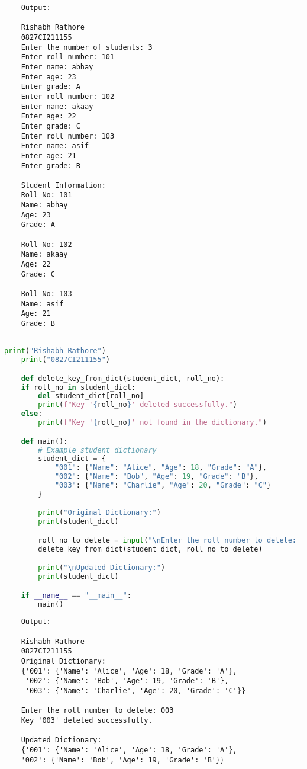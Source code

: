\documentclass{report}
\begin{document}
\begin{verbatim}
	Output:

	Rishabh Rathore
	0827CI211155
	Enter the number of students: 3
	Enter roll number: 101
	Enter name: abhay
	Enter age: 23
	Enter grade: A
	Enter roll number: 102
	Enter name: akaay
	Enter age: 22
	Enter grade: C
	Enter roll number: 103
	Enter name: asif
	Enter age: 21
	Enter grade: B
	
	Student Information:
	Roll No: 101
	Name: abhay
	Age: 23
	Grade: A
	
	Roll No: 102
	Name: akaay
	Age: 22
	Grade: C
	
	Roll No: 103
	Name: asif
	Age: 21
	Grade: B
	

\end{verbatim}


\newpage


\sol 
\begin{lstlisting}[language=Python]
	print("Rishabh Rathore")
	print("0827CI211155")

	def delete_key_from_dict(student_dict, roll_no):
    if roll_no in student_dict:
        del student_dict[roll_no]
        print(f"Key '{roll_no}' deleted successfully.")
    else:
        print(f"Key '{roll_no}' not found in the dictionary.")

	def main():
		# Example student dictionary
		student_dict = {
			"001": {"Name": "Alice", "Age": 18, "Grade": "A"},
			"002": {"Name": "Bob", "Age": 19, "Grade": "B"},
			"003": {"Name": "Charlie", "Age": 20, "Grade": "C"}
		}

		print("Original Dictionary:")
		print(student_dict)

		roll_no_to_delete = input("\nEnter the roll number to delete: ")
		delete_key_from_dict(student_dict, roll_no_to_delete)

		print("\nUpdated Dictionary:")
		print(student_dict)

	if __name__ == "__main__":
		main()

\end{lstlisting}

\begin{verbatim}
	Output:

	Rishabh Rathore
	0827CI211155
	Original Dictionary:
	{'001': {'Name': 'Alice', 'Age': 18, 'Grade': 'A'}, 
	 '002': {'Name': 'Bob', 'Age': 19, 'Grade': 'B'},
	 '003': {'Name': 'Charlie', 'Age': 20, 'Grade': 'C'}}

	Enter the roll number to delete: 003
	Key '003' deleted successfully.

	Updated Dictionary:
	{'001': {'Name': 'Alice', 'Age': 18, 'Grade': 'A'}, 
	'002': {'Name': 'Bob', 'Age': 19, 'Grade': 'B'}}
	

\end{verbatim}
\end{document}
